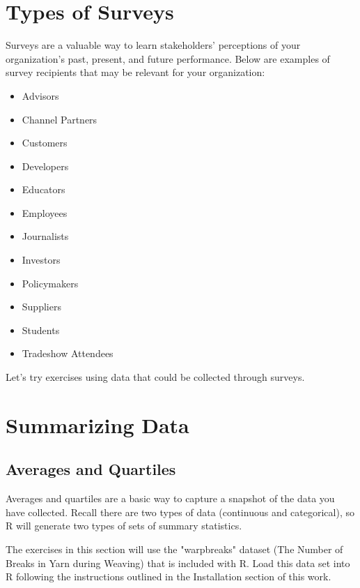 %
%
%
%
%

\section{Types of Surveys}
Surveys are a valuable way to learn stakeholders' perceptions of your organization's past, present, and future performance. Below are examples of survey recipients that may be relevant for your organization:

\begin{itemize}
 \item Advisors
 \item Channel Partners
 \item Customers
 \item Developers
 \item Educators
 \item Employees
 \item Journalists
 \item Investors
 \item Policymakers
 \item Suppliers
 \item Students
 \item Tradeshow Attendees
\end{itemize}

Let's try exercises using data that could be collected through surveys.

\section{Summarizing Data}

\subsection{Averages and Quartiles}
Averages and quartiles are a basic way to capture a snapshot of the data you have collected. Recall there are two types of data (continuous and categorical), so R will generate two types of sets of summary statistics.

The exercises in this section will use the "warpbreaks" dataset (The Number of Breaks in Yarn during Weaving) that is included with R. Load this data set into R following the instructions outlined in the Installation section of this work.

